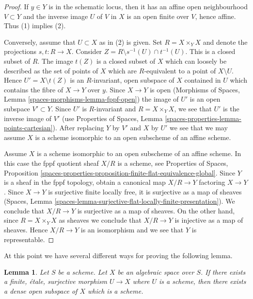 \documentclass{stacks-project}
\theoremstyle{plain}
\newtheorem{lemma}[subsection]{Lemma}
\theoremstyle{definition}
\theoremstyle{remark}
\numberwithin{equation}{subsection}
\begin{document}
\begin{proof}
If $y \in Y$ is in the schematic locus, then it has an affine open
neighbourhood $V \subset Y$ and the inverse image $U$ of $V$ in $X$
is an open finite over $V$, hence affine. Thus (1) implies (2).

\medskip\noindent
Conversely, assume that $U \subset X$ as in (2) is given.
Set $R = X \times_Y X$ and denote the projections $s, t : R \to X$.
Consider $Z = R \setminus s^{-1}(U) \cap t^{-1}(U)$.
This is a closed subset of $R$. The image $t(Z)$ is a closed
subset of $X$ which can loosely be described as the set of
points of $X$ which are $R$-equivalent to a point of
$X \setminus U$. Hence $U' = X \setminus t(Z)$ is an $R$-invariant,
open subspace of $X$ contained in $U$ which contains
the fibre of $X \to Y$ over $y$. Since $X \to Y$ is open
(Morphisms of Spaces, Lemma \ref{spaces-morphisms-lemma-fppf-open})
the image of $U'$ is an open subspace $V' \subset Y$.
Since $U'$ is $R$-invariant and $R = X \times_Y X$, we see that $U'$ is the
inverse image of $V'$ (use
Properties of Spaces, Lemma \ref{spaces-properties-lemma-points-cartesian}).
After replacing $Y$ by $V'$ and $X$ by $U'$ we see that we may assume
$X$ is a scheme isomorphic to an open subscheme of an affine scheme.

\medskip\noindent
Assume $X$ is a scheme isomorphic to an open subscheme of an affine scheme.
In this case the fppf quotient sheaf $X/R$ is a scheme, see
Properties of Spaces, Proposition
\ref{spaces-properties-proposition-finite-flat-equivalence-global}.
Since $Y$ is a sheaf in the fppf topology, obtain a canonical
map $X/R \to Y$ factoring $X \to Y$. Since $X \to Y$ is surjective
finite locally free, it is surjective as a map of sheaves
(Spaces, Lemma \ref{spaces-lemma-surjective-flat-locally-finite-presentation}).
We conclude that $X/R \to Y$ is surjective as a map of sheaves.
On the other hand, since $R = X \times_Y X$ as sheaves we conclude that
$X/R \to Y$ is injective as a map of sheaves. Hence $X/R \to Y$
is an isomorphism and we see that $Y$ is representable.
\end{proof}

\noindent
At this point we have several different ways for proving the following
lemma.

\begin{lemma}
\label{lemma-finite-etale-cover-dense-open-scheme}
Let $S$ be a scheme. Let $X$ be an algebraic space over $S$.
If there exists a finite, \'etale, surjective morphism
$U \to X$ where $U$ is a scheme, then there exists a dense open subspace
of $X$ which is a scheme.
\end{lemma}
\end{document}
